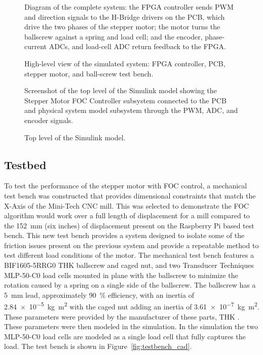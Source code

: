 \begin{figure}[htbp]
	\centering
		{Diagram of the complete system: the FPGA controller sends PWM and direction signals to the H-Bridge drivers on the PCB, which drive the two phases of the stepper motor; the motor turns the ballscrew against a spring and load cell; and the encoder, phase-current ADCs, and load-cell ADC return feedback to the FPGA.}
	\caption[Overview of the simulated system]{High-level view of the simulated system: FPGA controller, PCB, stepper motor, and ball-screw test bench.}
	\label{fig:system_overview}
\end{figure}
\begin{figure}[htbp]
	\centering
		{Screenshot of the top level of the Simulink model showing the Stepper Motor FOC Controller subsystem connected to the PCB and physical system model subsystem through the PWM, ADC, and encoder signals.}
	\caption[Top level of the Simulink model]{Top level of the Simulink model.}
	\label{fig:simulink_top}
\end{figure}


\subsection{Testbed}\label{testbed}

To test the performance of the stepper motor with FOC control, a mechanical test bench was constructed that provides dimensional constraints that match the X-Axis of the Mini-Tech CNC mill. This was selected to demonstrate the FOC algorithm would work over a full length of displacement for a mill compared to the \SI{152}{\milli\meter} (six inches) of displacement present on the Raspberry Pi based test bench. This new test bench provides a system designed to isolate some of the friction issues present on the previous system and provide a repeatable method to test different load conditions of the motor. The mechanical test bench features a BIF1605-5RRG0 THK ballscrew and caged nut, and two Transducer Techniques MLP-50-C0 load cells mounted in plane with the ballscrew to minimize the rotation caused by a spring on a single side of the ballscrew. The ballscrew has a \SI{5}{\milli\meter} lead, approximately \SI{90}{\percent} efficiency, with an inertia of \SI{2.84e-5}{\kilogram\meter\squared} with the caged nut adding an inertia of \SI{3.61e-7}{\kilogram\meter\squared}. These parameters were provided by the manufacturer of these parts, THK \cite{thk_ball_screw}. These parameters were then modeled in the simulation. In the simulation the two MLP-50-C0 load cells are modeled as a single load cell that fully captures the load. The test bench is shown in Figure~\ref{fig:testbench_cad}.


